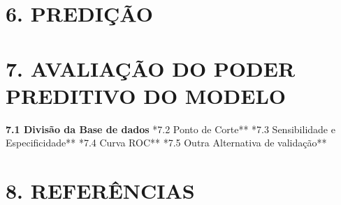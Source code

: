 \documentclass[]{article}
\begin{document}
\section{6. PREDIÇÃO}\label{predicao}

\section{7. AVALIAÇÃO DO PODER PREDITIVO DO
MODELO}\label{avaliacao-do-poder-preditivo-do-modelo}

\textbf{7.1 Divisão da Base de dados} \newline **7.2 Ponto de Corte**
\newline **7.3 Sensibilidade e Especificidade** \newline **7.4 Curva
ROC** \newline **7.5 Outra Alternativa de validação**

\section{8. REFERÊNCIAS}\label{referencias}

\section{}\label{section}
\end{document}
